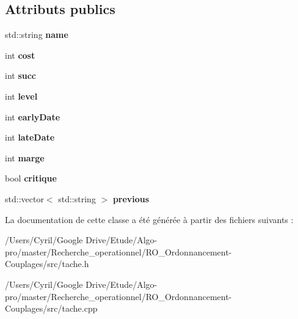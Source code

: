 \subsection*{Attributs publics}
\begin{DoxyCompactItemize}
\item 
\hypertarget{class_tache_a84754769b146cc83b5b09f9eba4cf16a}{std\-::string {\bfseries name}}\label{class_tache_a84754769b146cc83b5b09f9eba4cf16a}

\item 
\hypertarget{class_tache_a59891208c44435c233826b0975fdb832}{int {\bfseries cost}}\label{class_tache_a59891208c44435c233826b0975fdb832}

\item 
\hypertarget{class_tache_adb93208a398b6ac44504f711c9c2d72b}{int {\bfseries succ}}\label{class_tache_adb93208a398b6ac44504f711c9c2d72b}

\item 
\hypertarget{class_tache_ae960829eb565a679d61d650f61a5bb34}{int {\bfseries level}}\label{class_tache_ae960829eb565a679d61d650f61a5bb34}

\item 
\hypertarget{class_tache_ae4a5f8e17b1115538d5b5d33ba6a116e}{int {\bfseries early\-Date}}\label{class_tache_ae4a5f8e17b1115538d5b5d33ba6a116e}

\item 
\hypertarget{class_tache_ae0b3c42bed5ad1660b3c96c6912ab4df}{int {\bfseries late\-Date}}\label{class_tache_ae0b3c42bed5ad1660b3c96c6912ab4df}

\item 
\hypertarget{class_tache_a7e17677bad83d53f8fefc3d9e19cbe7e}{int {\bfseries marge}}\label{class_tache_a7e17677bad83d53f8fefc3d9e19cbe7e}

\item 
\hypertarget{class_tache_a080a82ff28eb64709e755c0b0d15ee5d}{bool {\bfseries critique}}\label{class_tache_a080a82ff28eb64709e755c0b0d15ee5d}

\item 
\hypertarget{class_tache_a74d97b66bbc5d8ad6d5c1d7df614b36f}{std\-::vector$<$ std\-::string $>$ {\bfseries previous}}\label{class_tache_a74d97b66bbc5d8ad6d5c1d7df614b36f}

\end{DoxyCompactItemize}


La documentation de cette classe a été générée à partir des fichiers suivants \-:\begin{DoxyCompactItemize}
\item 
/\-Users/\-Cyril/\-Google Drive/\-Etude/\-Algo-\/pro/master/\-Recherche\-\_\-operationnel/\-R\-O\-\_\-\-Ordonnancement-\/\-Couplages/src/tache.\-h\item 
/\-Users/\-Cyril/\-Google Drive/\-Etude/\-Algo-\/pro/master/\-Recherche\-\_\-operationnel/\-R\-O\-\_\-\-Ordonnancement-\/\-Couplages/src/tache.\-cpp\end{DoxyCompactItemize}
